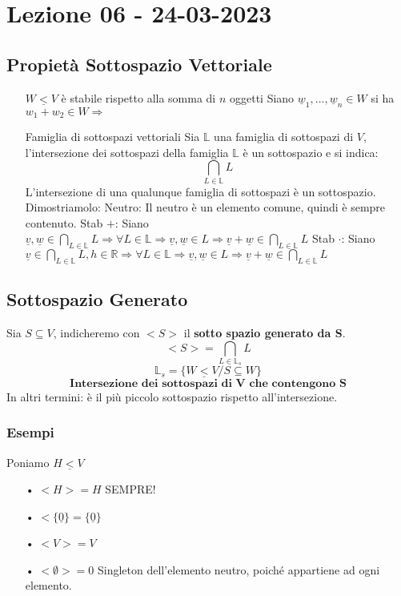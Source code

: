 \section{Lezione 06 - 24-03-2023}

\subsection{Propietà Sottospazio Vettoriale}

\begin{itemize}
\item[$W \underline{<} V$ è stabile rispetto alla somma di $n$ oggetti]
Siano $\underline{w}_1, ... , \underline{w}_n \in W$ si ha $w_1 + w_2 \in W \Rightarrow$ 
\item[Famiglia di sottospazi vettoriali]
Sia $ \mathbb{L}$ una famiglia di sottospazi di $V$, l'intersezione dei sottospazi della famiglia $\mathbb{L}$ è un sottospazio e si indica: 
$$ \bigcap_{L \in \mathbb{L}} L $$
L'intersezione di una qualunque famiglia di sottospazi è un sottospazio.\\
Dimostriamolo: 
	\subitem Neutro: Il neutro è un elemento comune, quindi è sempre contenuto.
	\subitem Stab $+$: Siano $ \underline{v},\underline{w} \in \bigcap_{L \in \mathbb{L}} L \Rightarrow \forall L \in \mathbb{L} \Rightarrow \underline{v},\underline{w} \in L \Rightarrow \underline{v}+\underline{w} \in \bigcap_{L \in \mathbb{L}} L $
	\subitem Stab $\cdot$: Siano $ \underline{v} \in \bigcap_{L \in \mathbb{L}} L, h \in \mathbb{R} \Rightarrow \forall L \in \mathbb{L} \Rightarrow \underline{v},\underline{w} \in L \Rightarrow \underline{v}+\underline{w} \in \bigcap_{L \in \mathbb{L}} L $
\end{itemize}

\subsection{Sottospazio Generato}
Sia $ S \subseteq V $, indicheremo con $<S>$ il \textbf{sotto spazio generato da S}.\\
$$ <S> = \bigcap_{L \in \mathbb{L}_s} L $$ 
$$ \mathbb{L}_s = \{W \underline{<} V / S \subseteq W \} $$
$$ \textbf{Intersezione dei sottospazi di V che contengono S} $$
In altri termini: è il più piccolo sottospazio rispetto all'intersezione.

\subsubsection{Esempi}
Poniamo $ H \underline{<} V $
\begin{itemize}
\item[•] $ <H> = H $ SEMPRE!
\item[•] $ <\{\underline{0}\} = \{\underline{0}\} $
\item[•] $ <V> = V $ 
\item[•] $ <\emptyset> = {0} $ Singleton dell'elemento neutro, poiché appartiene ad ogni elemento.
\end{itemize}

